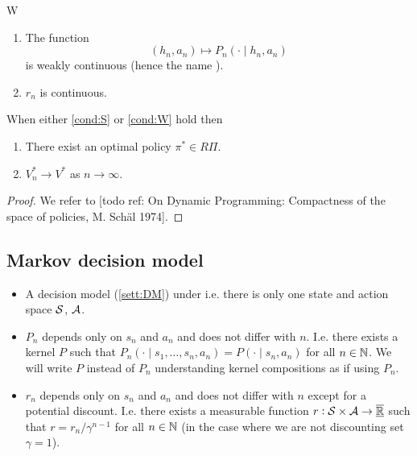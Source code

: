 \begin{cond}{W}
  \begin{enumerate}
    \item The function
      \[(h_n, a_n) \mapsto P_n(\cdot \mid h_n, a_n)\]
	is weakly continuous (hence the name ).
    \item $r_n$ is continuous.
  \end{enumerate}
  \label{cond:W}
\end{cond}

\begin{thm}
  When either \cref{cond:S} or \cref{cond:W} hold then
  \begin{enumerate}
    \item There exist an optimal policy $\pi^* \in R\Pi$.
    \item $V^*_n \to V^*$ as $n \to \infty$.
  \end{enumerate}
\end{thm}
\begin{proof}
  We refer to [todo ref: On Dynamic Programming: Compactness of the space of
  policies, M. Schäl 1974]. %
\end{proof}

\subsection{Markov decision model}

\begin{sett}
  \begin{itemize}
    \item A decision model (\cref{sett:DM}) under
       i.e. there is only one state
      and action space $\mathcal{S}$, $\mathcal{A}$.
    \item $P_n$ depends only on $s_n$ and $a_n$ and does not
      differ with $n$. I.e. there exists a kernel $P$ such that
      $P_n(\cdot \mid s_1, \dots, s_n, a_n) = P(\cdot \mid s_n, a_n)$
      for all $n \in \mathbb{N}$. We will write $P$ instead of $P_n$ understanding
      kernel compositions as if using $P_n$.
    \item $r_n$ depends only on $s_n$ and $a_n$ and does not differ
      with $n$ except for a potential discount.
      I.e. there exists a measurable function
      $r:\mathcal{S}\times\mathcal{A} \to \overline{\underline{\mathbb{R}}}$
      such that
      $r = r_n/\gamma^{n-1}$ for all $n \in \mathbb{N}$ (in the case where we 
      are not discounting set $\gamma = 1$).
  \end{itemize}
  \label{sett:MDM}
\end{sett}
%

